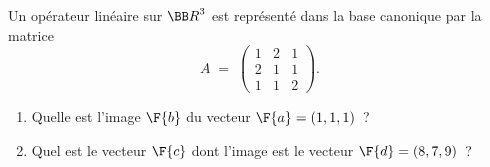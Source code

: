 \documentclass[12pt,french,oneside,a4paper]{memoir} %
\begin{document}
\begin{exo}
Un opérateur linéaire sur ${\BB R}^3$ est représenté dans la base 
canonique par la matrice
\begin{equation*}
A\;=\; \left( \begin{array}{ccc}
1 &2 &1 \\
2 &1 &1 \\
1 &1 &2
\end{array} \right).
\end{equation*}
\begin{enumerate}
\item Quelle est l'image $\F{\mathstrut{b}}$ du vecteur $\F{\mathstrut{a}}=(1,1,1)$~?
\item Quel est le vecteur $\F{\mathstrut{c}}$ dont l'image est le vecteur 
$\F{\mathstrut{d}}=(8,7,9)$~?
\end{enumerate}
\end{exo}
\end{document}
